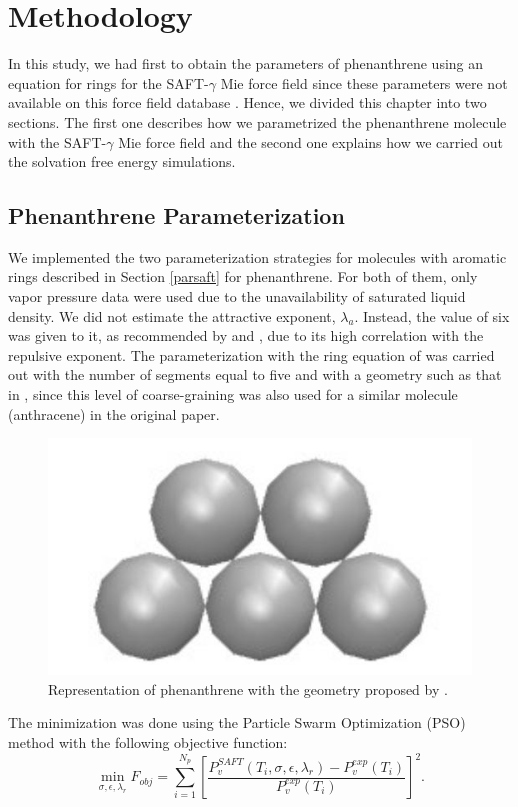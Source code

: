 \chapter{Methodology} %

\label{Chapter4} %

In this study, we had first to obtain the parameters of phenanthrene using an equation for rings for the SAFT-$\gamma$ Mie force field since these parameters were not available on this force field database \cite{ervik2016}. Hence, we divided this chapter into two sections. The first one describes how we parametrized the phenanthrene molecule with the SAFT-$\gamma$ Mie force field and the second one explains how we carried out the solvation free energy simulations. 

\section{Phenanthrene Parameterization}\label{parame}

We implemented the two parameterization strategies for molecules with aromatic rings described in Section \ref{parsaft} for phenanthrene. For both of them, only vapor pressure data \cite{pvphen} were used due to the unavailability of saturated liquid density. We did not estimate the attractive exponent, $\lambda _{a}$. Instead, the value of six was given to it, as recommended by  and , due to its high correlation with the repulsive exponent. The parameterization with the ring equation of  was carried out with the number of segments equal to five and with a geometry such as that in , since this level of coarse-graining was also used for a similar molecule (anthracene) in the original paper.
\begin{figure}[th]
	\centering
	\includegraphics[width=0.25\linewidth]{Figures/fen5}
	\caption{Representation of phenanthrene with the geometry proposed by . }
	\label{fig:fen5}
\end{figure}

The minimization was done using the Particle Swarm Optimization (PSO)  method \cite{pso} with the following objective function:
\begin{equation}
\min\limits_{\sigma,\epsilon,\lambda_{r}} F_{obj} = \sum_{i=1}^{N_{p}} \left[\frac{P_{v}^{SAFT}(T_{i},\sigma,\epsilon,\lambda_{r})-P_{v}^{exp}(T_{i})}{P_{v}^{exp}(T_{i})} \right]^2 .
\label{eqn:fobjm}
\end{equation}

